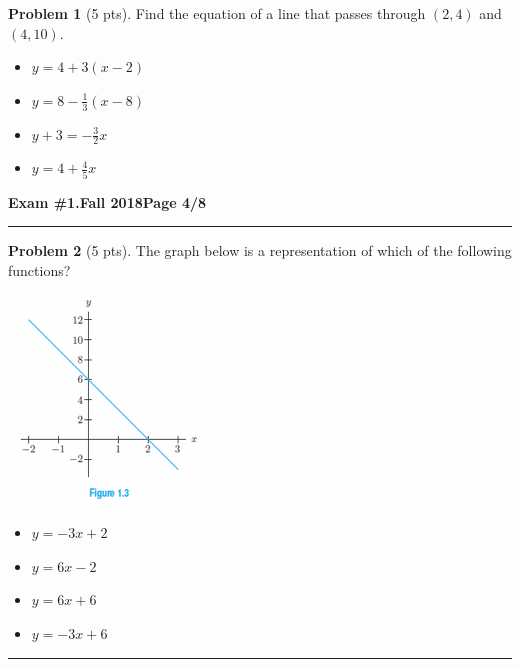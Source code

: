\documentclass[12pt]{article}
\makeatletter
\theoremstyle{definition}
\newtheorem{problem}{Problem}
\newcommand*{\radiobutton}{%
  \@ifstar{\@radiobutton0}{\@radiobutton1}%
}
\newcommand*{\@radiobutton}[1]{%
  \begin{tikzpicture}
    \pgfmathsetlengthmacro\radius{height("X")/2}
    \draw[radius=\radius] circle;
    \ifcase#1 \fill[radius=.6*\radius] circle;\fi
  \end{tikzpicture}%
}
\makeatother
\begin{document}
\begin{problem}[5 pts]
  Find the equation of a line that passes through $(2,4)$ and $(4,10)$.
  \begin{itemize}
  \item[\radiobutton] $y=4+3(x-2)$
  \item[\radiobutton] $y=8-\tfrac{1}{3}(x-8)$
  \item[\radiobutton] $y+3=-\tfrac{3}{2}x$
  \item[\radiobutton] $y=4+\tfrac{4}{5}x$
  \end{itemize}
\end{problem}
\newpage

\hfill{\large\bf Exam \#1.}\hfill{\large\bf Fall 2018}\hfill{\large\bf Page 4/8}\hrule

\bigskip
\begin{problem}[5 pts]
  The graph below is a representation of which of the following functions?
  \begin{multicols}{2}
    \begin{center}
      \includegraphics{1graph2.png}
    \end{center}
    \begin{itemize}
    \item[\radiobutton] $y=-3x+2$
    \item[\radiobutton] $y=6x-2$
    \item[\radiobutton] $y=6x+6$
    \item[\radiobutton] $y=-3x+6$
     \end{itemize}
  \end{multicols}
\end{problem}
\hrule
\end{document}
